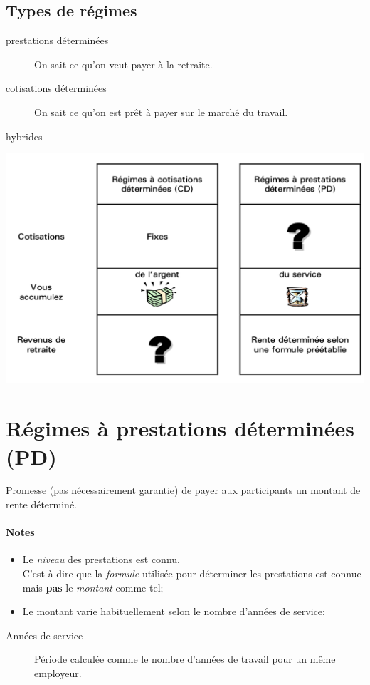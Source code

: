 \documentclass[10pt, french]{article}
\begin{document}
\begin{multicols*}{3}
\subsection*{Types de régimes}

\begin{description}
	\item[prestations déterminées]	On sait ce qu'on veut payer à la retraite.
	\item[cotisations déterminées]	On sait ce qu'on est prêt à payer sur le marché du travail.
	\item[hybrides]
\end{description}

\begin{center}
	\includegraphics[scale=0.33]{src/ACT-1005/CD-PD-table.png}
\end{center}

\columnbreak

\section*{Régimes à prestations déterminées (PD)}

\begin{definitionNOHFILL}[Description]
Promesse (pas nécessairement garantie) de payer aux participants un montant de rente déterminé.

\paragraph{Notes}
\begin{itemize}[leftmargin = *]
	\item	Le \textit{niveau} des prestations est connu.\\
			C'est-à-dire que la \textit{formule} utilisée pour déterminer les prestations est connue mais \textbf{pas} le \textit{montant} comme tel;
	\item	Le montant varie habituellement selon le nombre d'années de service;
\end{itemize}
\begin{description}
	\item[Années de service]	Période calculée comme le nombre d'années de travail pour un même employeur.
\end{description}
\end{definitionNOHFILL}


\end{multicols*}
\end{document}
